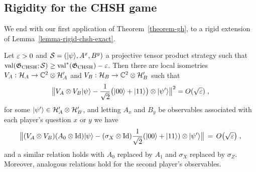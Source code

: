 \subsection{Rigidity for the CHSH game}
\label{subsection-chsh-rigid}

We end with our first application of Theorem~\ref{theorem-gh}, to a rigid extension of Lemma~\ref{lemma-rigid-chsh-exact}.

\begin{theorem}\label{theorem-rigid-chsh}
Let $\varepsilon>0$ and $\mathcal{S} = (|\psi\rangle,A^x,B^y)$ a projective tensor product strategy such that $\mathrm{val}(\mathfrak{G}_{\mathrm{CHSH}};\mathcal{S})\geq\mathrm{val}^*(\mathfrak{G}_{\mathrm{CHSH}})-\varepsilon$. Then there are local isometries $V_A:\mathcal{H}_A \to \mathbb{C}^2 \otimes \mathcal{H}'_A$ and $V_B:\mathcal{H}_B \to \mathbb{C}^2 \otimes \mathcal{H}'_B$  such that 
\begin{equation}\label{equation-chsh-state}
\big\| V_A \otimes V_B |\psi\rangle - \frac{1}{\sqrt{2}}\big(|00\rangle+|11\rangle\big) \otimes |\psi'\rangle \big\|^2 = O(\sqrt{\varepsilon}) \;,
\end{equation}
for some $|\psi'\rangle\in \mathcal{H}_A'\otimes \mathcal{H}_B'$, and letting $A_x$ and $B_y$ be observables associated with each player's question $x$ or $y$ we have
\begin{equation}\label{equation-chsh-alice}
\big\|( V_A \otimes V_B)( A_0 \otimes \mathop{\rm Id}\nolimits )|\psi\rangle - (\sigma_X \otimes \mathop{\rm Id}\nolimits)\frac{1}{\sqrt{2}}(|00\rangle+|11\rangle) \otimes |\psi'\rangle \big\| \,=\, O\big(\sqrt{\varepsilon}\big)\;,
\end{equation}
and a similar relation holds with $A_0$ replaced by $A_1$ and $\sigma_X$ replaced by $\sigma_Z$. Moreover, analogous relations hold for the second player's observables. 
\end{theorem}

